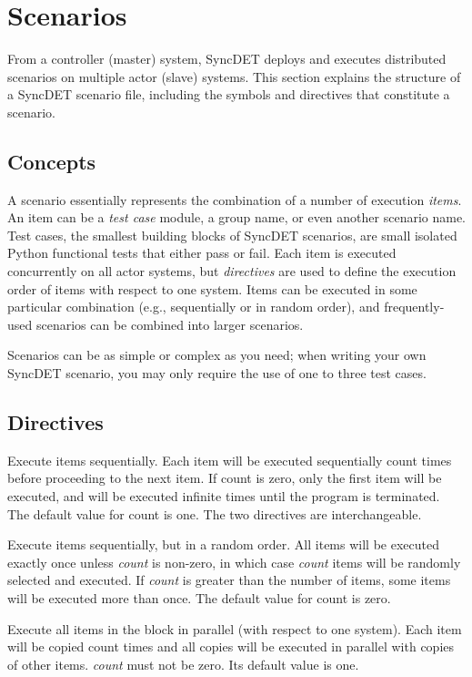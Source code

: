 \section{Scenarios}

From a controller (master) system, SyncDET deploys and executes distributed
scenarios on multiple actor (slave) systems. This section explains the structure
of a SyncDET scenario file, including the symbols and directives that constitute
a scenario.

\subsection{Concepts}
A scenario essentially represents the combination of a number of execution {\em
items}. An item can be a {\em test case} module, a group name, or even another
scenario name. Test cases, the smallest building blocks of SyncDET scenarios,
are small isolated Python functional tests that either pass or fail. Each item
is executed concurrently on all actor systems, but {\em directives} are used to
define the execution order of items with respect to one system.  Items can be
executed in some particular combination (e.g., sequentially or in random order),
and frequently-used scenarios can be combined into larger scenarios.

Scenarios can be as simple or complex as you need; when writing your own SyncDET
scenario, you may only require the use of one to three test cases.

\subsection{Directives}

Execute items sequentially. Each item will be executed sequentially count times
before proceeding to the next item. If count is zero, only the first item will
be executed, and will be executed infinite times until the program is
terminated. The default value for count is one. The two directives are
interchangeable.

Execute items sequentially, but in a random order. All items will be executed
exactly once unless {\it count} is non-zero, in which case {\it count} items
will be randomly selected and executed. If {\it count} is greater than the
number of items, some items will be executed more than once. The default value
for count is zero.

Execute all items in the block in parallel (with respect to one system). Each
item will be copied count times and all copies will be executed in parallel with
copies of other items. {\it count} must not be zero. Its default value is one.

